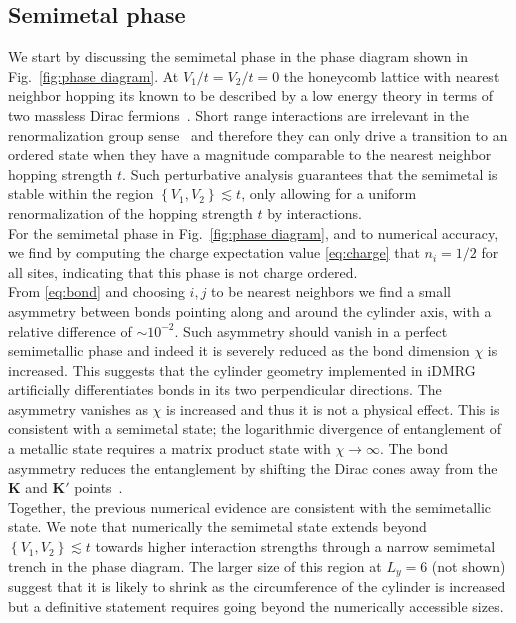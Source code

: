 \documentclass[aps,prx,10pt,twocolumn,floatfix,superscriptaddress,showpacs,numerical,footinbib]{revtex4-1}
\begin{document}
%

\subsection{Semimetal phase \label{subsec:SM}}
%
We start by discussing the semimetal phase in the phase diagram shown in Fig.~\ref{fig:phase diagram}.
%
At $V_{1}/t=V_{2}/t=0$ the honeycomb lattice with nearest neighbor hopping its 
known to be described by a low energy theory in terms of two massless Dirac fermions~\cite{CastroNeto2009}.
%
Short range interactions are irrelevant in the renormalization group sense~\cite{S94,KUP12} 
and therefore they can only drive a transition to an ordered state when they have a magnitude comparable to the nearest neighbor hopping strength $t$.
%
Such perturbative analysis guarantees that the semimetal is stable within
the region $\left\lbrace V_{1},V_{2}\right\rbrace \lesssim t$, only allowing for a uniform renormalization 
of the hopping strength $t$ by interactions.\\

%
For the semimetal phase in Fig.~\ref{fig:phase diagram}, and to numerical accuracy, we find by computing the charge expectation value
\eqref{eq:charge} that $n_{i}=1/2$ for all sites, indicating that this phase is not charge ordered.\\
%
From \eqref{eq:bond} and choosing $i,j$ to be nearest neighbors we find
a small asymmetry between bonds pointing along and around the cylinder axis,
with a relative difference of $\sim10^{-2}$.
%
Such asymmetry should vanish in a perfect semimetallic phase and indeed it is severely reduced as the bond dimension $\chi$ is increased.
% 
This suggests that the cylinder geometry implemented in iDMRG artificially differentiates bonds in its two perpendicular directions.
%
The asymmetry vanishes as $\chi$ is increased and thus it is not a physical effect.
%
This is consistent with a semimetal state; the logarithmic divergence of entanglement of a metallic state requires a matrix product state with $\chi\to\infty$. 
%
The bond asymmetry reduces the entanglement by shifting the Dirac cones away from the $\mathbf{K}$ and $\mathbf{K'}$ points~\cite{ACJ15}.\\
%
%
Together, the previous numerical evidence are consistent with the semimetallic state.
%
We note that numerically the semimetal state extends beyond $\left\lbrace V_{1},V_{2}\right\rbrace \lesssim t$ towards
higher interaction strengths through a narrow semimetal trench in the phase diagram.
%
The larger size of this region at $L_{y}=6$ (not shown) suggest that it is likely to shrink as the circumference of the cylinder is increased but
a definitive statement requires going beyond the numerically accessible sizes. 
%
\end{document}
